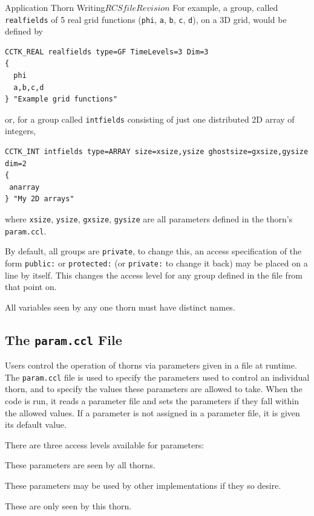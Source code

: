 \begin{cactuspart}{Application Thorn Writing}{$RCSfile$}{$Revision$}
For example, a group, called \texttt{realfields} of 5 real grid
functions (\texttt{phi}, \texttt{a},
\texttt{b}, \texttt{c}, \texttt{d}), on a 3D grid, would be defined by
\begin{verbatim}
CCTK_REAL realfields type=GF TimeLevels=3 Dim=3
{
  phi
  a,b,c,d
} "Example grid functions"
\end{verbatim}
or, for a group called \texttt{intfields} consisting of just one
distributed 2D array of integers,
\begin{verbatim}
CCTK_INT intfields type=ARRAY size=xsize,ysize ghostsize=gxsize,gysize dim=2
{
 anarray
} "My 2D arrays"
\end{verbatim}
where \texttt{xsize}, \texttt{ysize}, \texttt{gxsize}, \texttt{gysize} are all
parameters defined in the thorn's \texttt{param.ccl}.


By default, all groups are \texttt{private}, to change this, an access
specification of the form \texttt{public:} or \texttt{protected:} (or
\texttt{private:} to change it back) may be placed on a line by itself.  This
changes the access level for any group defined in the file from that point on.

All variables seen by any one thorn must have distinct names.

\subsection{The \texttt{param.ccl} File}
\label{subsec:param_ccl}

Users control the operation of thorns via parameters given in a file
at runtime.  The \texttt{param.ccl} file
is used to specify the parameters used to control an individual thorn, and
to specify the values these parameters are allowed to take.  When the code
is run, it reads a parameter file and sets the parameters if they fall
within the allowed values. If a parameter is not assigned in a parameter
file, it is given its default value.

There are three access levels available for parameters:

\begin{Lentry}
\item [\texttt{Global}]
These parameters are seen by all thorns.
\item [\texttt{Restricted}]
These parameters may be used by other implementations if they so desire.
\item [\texttt{Private}]
These are only seen by this thorn.
\end {Lentry}


\end{cactuspart}
